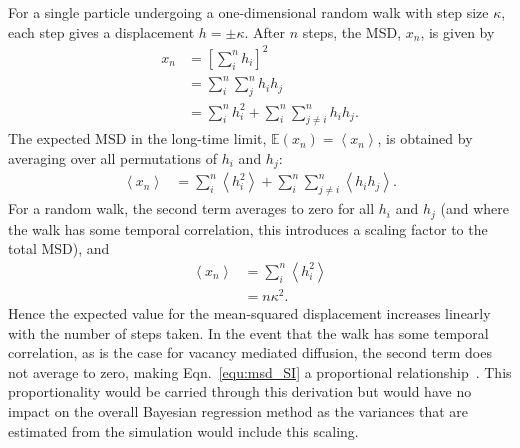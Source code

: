 \documentclass[reprint,superscriptaddress,nobibnotes,amsmath,amssymb,aps,prx,hidelinks,linenumbers]{revtex4-2}
\newcommand{\oMSDn}{\ensuremath{x_n}}
\newcommand{\moMSDn}{\ensuremath{\left<\oMSDn\right>}}
\begin{document}
For a single particle undergoing a one-dimensional random walk with step size $\kappa$, each step gives a displacement $h = \pm \kappa$.
After $n$ steps, the MSD, $\oMSDn$, is given by
\begin{equation}
  \begin{aligned}
    \oMSDn &= \left[\sum_i^n h_i\right]^2\\
           &= \sum_i^n\sum_j^n h_i h_j \\
           &= \sum_i^n h_i^2 + \sum_i^n\sum_{j\neq i}^n h_ih_j.
  \end{aligned}
\end{equation}
The expected MSD in the long-time limit, $\mathbb{E}(\oMSDn) = \moMSDn$, is obtained by averaging over all permutations of $h_i$ and $h_j$:
\begin{equation}
  \begin{aligned}
    \moMSDn &= \sum_i^n \left<h_i^2\right> + \sum_i^n\sum_{j\neq i}^n\left<h_i h_j\right>.
  \end{aligned}
\end{equation}
For a random walk, the second term averages to zero for all $h_i$ and $h_j$ (and where the walk has some temporal correlation, this introduces a scaling factor \cite{friauf_correlation_1962} to the total MSD), and
\begin{equation}
  \begin{aligned}
    \moMSDn &= \sum_i^n \left<h_i^2\right> \\
            &= n\kappa^2.
  \end{aligned}
  \label{equ:msd_SI}
\end{equation}
Hence the expected value for the mean-squared displacement increases linearly with the number of steps taken.
In the event that the walk has some temporal correlation, as is the case for vacancy mediated diffusion, the second term does not average to zero, making Eqn.~\ref{equ:msd_SI} a proportional relationship~\cite{friauf_correlation_1962}.
This proportionality would be carried through this derivation but would have no impact on the overall Bayesian regression method as the variances that are estimated from the simulation would include this scaling.  
\end{document}
